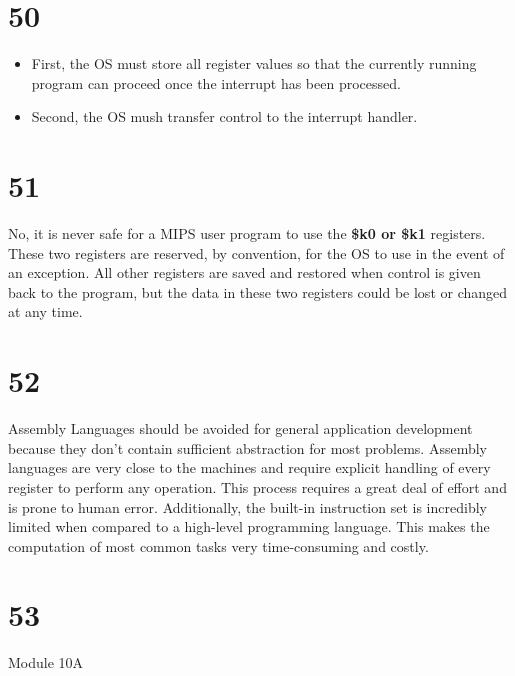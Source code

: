 \documentclass[a4paper,11pt]{article}
\begin{document}

\section*{50}
\begin{itemize}
  \item First, the OS must store all register values so that the currently running program can proceed once the interrupt has been processed.
  \item Second, the OS mush transfer control to the interrupt handler.
\end{itemize}


\section*{51}
No, it is never safe for a MIPS user program to use the {\bf \$k0 or \$k1} registers.  These two registers are reserved, by convention, for the OS to use in the event of an exception.  All other registers are saved and restored when control is given back to the program, but the data in these two registers could be lost or changed at any time.


\section*{52}
Assembly Languages should be avoided for general application development because they don't contain sufficient abstraction for most problems.  Assembly languages are very close to the machines and require explicit handling of every register to perform any operation.  This process requires a great deal of effort and is prone to human error.  Additionally, the built-in instruction set is incredibly limited when compared to a high-level programming language.  This makes the computation of most common tasks very time-consuming and costly.



\section*{53}
Module 10A

\end{document}
